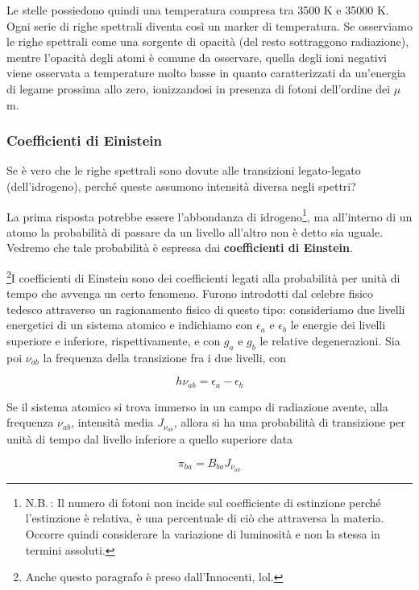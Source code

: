 Le stelle possiedono quindi una temperatura compresa tra 3500 K e 35000 K. Ogni serie di righe spettrali diventa così un marker di temperatura. Se osserviamo le righe spettrali come una sorgente di opacità (del resto sottraggono radiazione), mentre l'opacità degli atomi è comune da osservare, quella degli ioni negativi viene osservata a temperature molto basse in quanto caratterizzati da un'energia di legame prossima allo zero, ionizzandosi in presenza di fotoni dell'ordine dei $\mu$m.

\subsubsection{Coefficienti di Einistein}

Se è vero che le righe spettrali sono dovute alle transizioni legato-legato (dell'idrogeno), perché queste assumono intensità diversa negli spettri?

La prima risposta potrebbe essere l'abbondanza di idrogeno\footnote{N.B.\,: Il numero di fotoni non incide sul coefficiente di estinzione perché l'estinzione è relativa, è una percentuale di ciò che attraversa la materia. Occorre quindi considerare la variazione di luminosità e non la stessa in termini assoluti.}, ma all'interno di un atomo la probabilità di passare da un livello all'altro non è detto sia uguale. Vedremo che tale probabilità è espressa dai \textbf{coefficienti di Einstein}.

\footnote{Anche questo paragrafo è preso dall'Innocenti, lol.}I coefficienti di Einstein sono dei coefficienti legati alla probabilità per unità di tempo che avvenga un certo fenomeno. Furono introdotti dal celebre fisico tedesco attraverso un ragionamento fisico di questo tipo: consideriamo due livelli energetici di un sistema atomico e indichiamo con $\epsilon_a$ e $\epsilon_b$ le energie dei livelli superiore e inferiore, rispettivamente, e con $g_a$ e $g_b$ le relative degenerazioni. Sia poi $\nu_{ab}$ la frequenza della transizione fra i due livelli, con

\begin{equation*}
  h \nu_{ab}=\epsilon_a - \epsilon_b
\end{equation*}

Se il sistema atomico si trova immerso in un campo di radiazione avente, alla frequenza $\nu_{ab}$, intensità media $J_{\nu_{ab}}$, allora si ha una probabilità di transizione per unità di tempo dal livello inferiore a quello superiore data

\begin{equation*}
  \pi_{ba}=B_{ba} J_{\nu_{ab}}
\end{equation*}

